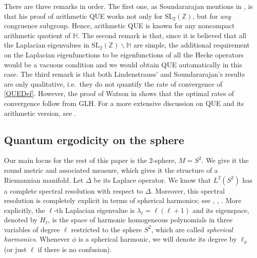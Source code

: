 \documentclass[11pt]{amsart}
\theoremstyle{definition}
\begin{document}
There are three remarks in order. The first one, as Soundararajan mentions in \cite[pp.~1530--1531]{SoundQUE}, is that his proof of arithmetic QUE works not only for $\mathrm{SL}_2(\mathbb{Z})$, but for \textit{any} congruence subgroup. Hence, arithmetic QUE is known for any noncompact arithmetic quotient of $\mathbb{H}$. The second remark is that, since it is believed that all the Laplacian eigenvalues in $\mathrm{SL}_{2}(\mathbb{Z}) \backslash \mathbb{H}$ are simple, the additional requirement on the Laplacian eigenfunctions to be eigenfunctions of all the Hecke operators would be a vacuous condition and we would obtain QUE automatically in this case. The third remark is that both Lindenstrauss' and Soundararajan's results are only qualitative, i.e.~they do not quantify the rate of convergence of \eqref{QUEDef}. However, the proof of Watson in \cite{WatsonPhD} shows that the optimal rates of convergence follow from GLH. For a more extensive discussion on QUE and its arithmetic version, see \cite{SarnakProgressQUE}.

\subsection{Quantum ergodicity on the sphere}

Our main focus for the rest of this paper is the $2$-sphere, $M=S^2$. We give it the round metric and associated measure, which gives it the structure of a Riemannian manifold. Let $\Delta$ be its Laplace operator. We know that $L^2(S^2)$ has a complete spectral resolution with respect to $\Delta$. Moreover, this spectral resolution is completely explicit in terms of spherical harmonics; see \cite[Thm.~2.9]{SpectrumLaplacian}, \cite[p.~140]{SteinWeiss}, \cite[Thm.~2.34, Prop.~3.5]{SpheHar}. More explicitly, the $\ell$-th Laplacian eigenvalue is $\lambda_{\ell} = \ell(\ell+1)$ and its eigenspace, denoted by $H_{\ell}$, is the space of harmonic homogeneous polynomials in three variables of degree $\ell$ restricted to the sphere $S^2$, which are called \textit{spherical harmonics}. Whenever $\phi$ is a spherical harmonic, we will denote its degree by $\ell_{\phi}$ (or just $\ell$ if there is no confusion).
\end{document}
